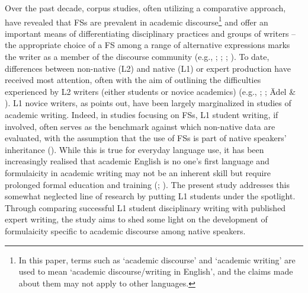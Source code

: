 \documentclass[output=paper]{langsci/langscibook}
\begin{document}
Over the past decade, corpus studies, often utilizing a comparative approach, have revealed that FSs are prevalent in academic discourse\footnote{In this paper, terms such as ‘academic discourse’ and ‘academic writing’ are used to mean ‘academic discourse/writing in English’, and the claims made about them may not apply to other languages.} and offer an important means of differentiating disciplinary practices and groups of writers – the appropriate choice of a FS among a range of alternative expressions marks the writer as a member of the discourse community (e.g., \citealt{BiberEtAl2004}; \citealt{Cortes2004}; \citealt{Hyland2008a,20122008a}; \citealt{Durrant2017}). To date, differences between non-native (L2) and native (L1) or expert production have received most attention, often with the aim of outlining the difficulties experienced by L2 writers (either students or novice academics) (e.g., \citealt{Hyland2008b}; \citealt{ChenBaker2010}; Ädel \& \citealt{Erman2012}). L1 novice writers, as \citet{Hyland2016} points out, have been largely marginalized in studies of academic writing. Indeed, in studies focusing on FSs, L1 student writing, if involved, often serves as the benchmark against which non-native data are evaluated, with the assumption that the use of FSs is part of native speakers’ inheritance (\citealt{WrayPerkins2000}). While this is true for everyday language use, it has been increasingly realised that academic English is no one’s first language and formulaicity in academic writing may not be an inherent skill but require prolonged formal education and training (\citealt{FergusonEtAl2011}; \citealt{Pérez-Llantada2014}). The present study addresses this somewhat neglected line of research by putting L1 students under the spotlight. Through comparing successful L1 student disciplinary writing with published expert writing, the study aims to shed some light on the development of formulaicity specific to academic discourse among native speakers. 
\end{document}
